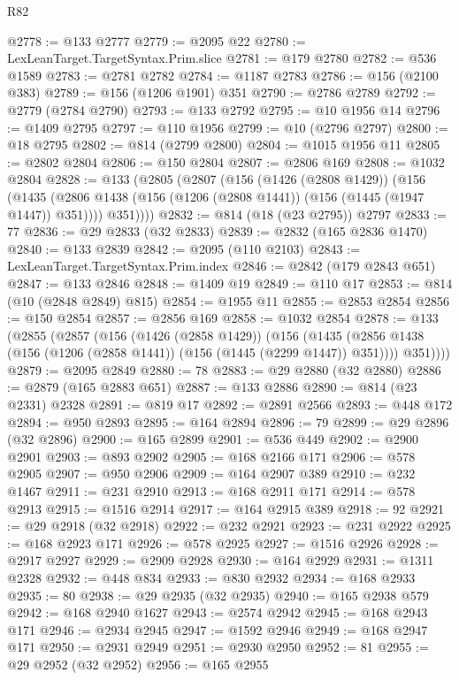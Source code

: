 \begin{lexlean}{R82}
\begin{coremodule}
@2778 := @133 @2777
@2779 := @2095 @22
@2780 := LexLeanTarget.TargetSyntax.Prim.slice
@2781 := @179 @2780
@2782 := @536 @1589
@2783 := @2781 @2782
@2784 := @1187 @2783
@2786 := @156 (@2100 @383)
@2789 := @156 (@1206 @1901) @351
@2790 := @2786 @2789
@2792 := @2779 (@2784 @2790)
@2793 := @133 @2792
@2795 := @10 @1956 @14
@2796 := @1409 @2795
@2797 := @110 @1956
@2799 := @10 (@2796 @2797)
@2800 := @18 @2795
@2802 := @814 (@2799 @2800)
@2804 := @1015 @1956 @11
@2805 := @2802 @2804
@2806 := @150 @2804
@2807 := @2806 @169
@2808 := @1032 @2804
@2828 := @133
    (@2805
      (@2807
        (@156
          (@1426 (@2808 @1429))
          (@156
            (@1435 (@2806 @1438 (@156 (@1206 (@2808 @1441)) (@156 (@1445 (@1947 @1447)) @351))))
            @351))))
@2832 := @814 (@18 (@23 @2795)) @2797
@2833 := 77
@2836 := @29 @2833 (@32 @2833)
@2839 := @2832 (@165 @2836 @1470)
@2840 := @133 @2839
@2842 := @2095 (@110 @2103)
@2843 := LexLeanTarget.TargetSyntax.Prim.index
@2846 := @2842 (@179 @2843 @651)
@2847 := @133 @2846
@2848 := @1409 @19
@2849 := @110 @17
@2853 := @814 (@10 (@2848 @2849) @815)
@2854 := @1955 @11
@2855 := @2853 @2854
@2856 := @150 @2854
@2857 := @2856 @169
@2858 := @1032 @2854
@2878 := @133
    (@2855
      (@2857
        (@156
          (@1426 (@2858 @1429))
          (@156
            (@1435 (@2856 @1438 (@156 (@1206 (@2858 @1441)) (@156 (@1445 (@2299 @1447)) @351))))
            @351))))
@2879 := @2095 @2849
@2880 := 78
@2883 := @29 @2880 (@32 @2880)
@2886 := @2879 (@165 @2883 @651)
@2887 := @133 @2886
@2890 := @814 (@23 @2331) @2328
@2891 := @819 @17
@2892 := @2891 @2566
@2893 := @448 @172
@2894 := @950 @2893
@2895 := @164 @2894
@2896 := 79
@2899 := @29 @2896 (@32 @2896)
@2900 := @165 @2899
@2901 := @536 @449
@2902 := @2900 @2901
@2903 := @893 @2902
@2905 := @168 @2166 @171
@2906 := @578 @2905
@2907 := @950 @2906
@2909 := @164 @2907 @389
@2910 := @232 @1467
@2911 := @231 @2910
@2913 := @168 @2911 @171
@2914 := @578 @2913
@2915 := @1516 @2914
@2917 := @164 @2915 @389
@2918 := 92
@2921 := @29 @2918 (@32 @2918)
@2922 := @232 @2921
@2923 := @231 @2922
@2925 := @168 @2923 @171
@2926 := @578 @2925
@2927 := @1516 @2926
@2928 := @2917 @2927
@2929 := @2909 @2928
@2930 := @164 @2929
@2931 := @1311 @2328
@2932 := @448 @834
@2933 := @830 @2932
@2934 := @168 @2933
@2935 := 80
@2938 := @29 @2935 (@32 @2935)
@2940 := @165 @2938 @579
@2942 := @168 @2940 @1627
@2943 := @2574 @2942
@2945 := @168 @2943 @171
@2946 := @2934 @2945
@2947 := @1592 @2946
@2949 := @168 @2947 @171
@2950 := @2931 @2949
@2951 := @2930 @2950
@2952 := 81
@2955 := @29 @2952 (@32 @2952)
@2956 := @165 @2955

\end{coremodule}
\end{lexlean}
